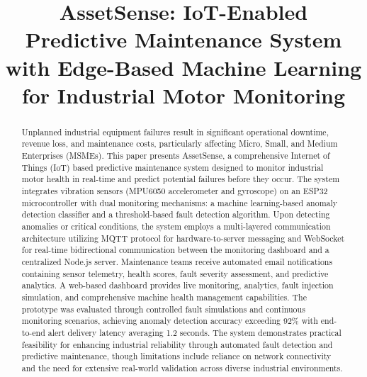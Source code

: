 \documentclass[conference]{IEEEtran}
\begin{document}
\title{AssetSense: IoT-Enabled Predictive Maintenance System with Edge-Based Machine Learning for Industrial Motor Monitoring\\
}

\author{
}

\maketitle

\begin{abstract}
Unplanned industrial equipment failures result in significant operational downtime, revenue loss, and maintenance costs, particularly affecting Micro, Small, and Medium Enterprises (MSMEs). This paper presents AssetSense, a comprehensive Internet of Things (IoT) based predictive maintenance system designed to monitor industrial motor health in real-time and predict potential failures before they occur. The system integrates vibration sensors (MPU6050 accelerometer and gyroscope) on an ESP32 microcontroller with dual monitoring mechanisms: a machine learning-based anomaly detection classifier and a threshold-based fault detection algorithm. Upon detecting anomalies or critical conditions, the system employs a multi-layered communication architecture utilizing MQTT protocol for hardware-to-server messaging and WebSocket for real-time bidirectional communication between the monitoring dashboard and a centralized Node.js server. Maintenance teams receive automated email notifications containing sensor telemetry, health scores, fault severity assessment, and predictive analytics. A web-based dashboard provides live monitoring, analytics, fault injection simulation, and comprehensive machine health management capabilities. The prototype was evaluated through controlled fault simulations and continuous monitoring scenarios, achieving anomaly detection accuracy exceeding 92\% with end-to-end alert delivery latency averaging 1.2 seconds. The system demonstrates practical feasibility for enhancing industrial reliability through automated fault detection and predictive maintenance, though limitations include reliance on network connectivity and the need for extensive real-world validation across diverse industrial environments.
\end{abstract}
\end{document}
